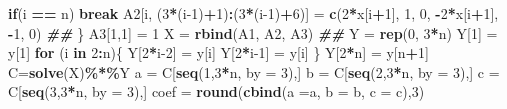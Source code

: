 \documentclass[
]{book}
\newenvironment{Shaded}{\begin{snugshade}}{\end{snugshade}}
\newcommand{\AttributeTok}[1]{\textcolor[rgb]{0.13,0.29,0.53}{#1}}
\newcommand{\ControlFlowTok}[1]{\textcolor[rgb]{0.13,0.29,0.53}{\textbf{#1}}}
\newcommand{\DecValTok}[1]{\textcolor[rgb]{0.00,0.00,0.81}{#1}}
\newcommand{\DocumentationTok}[1]{\textcolor[rgb]{0.56,0.35,0.01}{\textbf{\textit{#1}}}}
\newcommand{\FunctionTok}[1]{\textcolor[rgb]{0.13,0.29,0.53}{\textbf{#1}}}
\newcommand{\NormalTok}[1]{#1}
\newcommand{\OtherTok}[1]{\textcolor[rgb]{0.56,0.35,0.01}{#1}}
\newcommand{\SpecialCharTok}[1]{\textcolor[rgb]{0.81,0.36,0.00}{\textbf{#1}}}
\begin{document}
\begin{Shaded}
\begin{Highlighting}[]
       \ControlFlowTok{if}\NormalTok{(i }\SpecialCharTok{==}\NormalTok{ n) }\ControlFlowTok{break}
\NormalTok{       A2[i, (}\DecValTok{3}\SpecialCharTok{*}\NormalTok{(i}\DecValTok{{-}1}\NormalTok{)}\SpecialCharTok{+}\DecValTok{1}\NormalTok{)}\SpecialCharTok{:}\NormalTok{(}\DecValTok{3}\SpecialCharTok{*}\NormalTok{(i}\DecValTok{{-}1}\NormalTok{)}\SpecialCharTok{+}\DecValTok{6}\NormalTok{)] }\OtherTok{=} \FunctionTok{c}\NormalTok{(}\DecValTok{2}\SpecialCharTok{*}\NormalTok{x[i}\SpecialCharTok{+}\DecValTok{1}\NormalTok{], }\DecValTok{1}\NormalTok{, }\DecValTok{0}\NormalTok{, }\SpecialCharTok{{-}}\DecValTok{2}\SpecialCharTok{*}\NormalTok{x[i}\SpecialCharTok{+}\DecValTok{1}\NormalTok{], }\SpecialCharTok{{-}}\DecValTok{1}\NormalTok{, }\DecValTok{0}\NormalTok{)}
       \DocumentationTok{\#\#}
\NormalTok{      \}}
\NormalTok{     A3[}\DecValTok{1}\NormalTok{,}\DecValTok{1}\NormalTok{] }\OtherTok{=} \DecValTok{1}
\NormalTok{     X }\OtherTok{=} \FunctionTok{rbind}\NormalTok{(A1, A2, A3)}
     \DocumentationTok{\#\#}
\NormalTok{     Y }\OtherTok{=} \FunctionTok{rep}\NormalTok{(}\DecValTok{0}\NormalTok{, }\DecValTok{3}\SpecialCharTok{*}\NormalTok{n)}
\NormalTok{     Y[}\DecValTok{1}\NormalTok{] }\OtherTok{=}\NormalTok{ y[}\DecValTok{1}\NormalTok{]}
     \ControlFlowTok{for}\NormalTok{ (i }\ControlFlowTok{in} \DecValTok{2}\SpecialCharTok{:}\NormalTok{n)\{}
\NormalTok{         Y[}\DecValTok{2}\SpecialCharTok{*}\NormalTok{i}\DecValTok{{-}2}\NormalTok{] }\OtherTok{=}\NormalTok{ y[i]}
\NormalTok{         Y[}\DecValTok{2}\SpecialCharTok{*}\NormalTok{i}\DecValTok{{-}1}\NormalTok{] }\OtherTok{=}\NormalTok{ y[i]}
\NormalTok{        \}}
\NormalTok{     Y[}\DecValTok{2}\SpecialCharTok{*}\NormalTok{n] }\OtherTok{=}\NormalTok{ y[n}\SpecialCharTok{+}\DecValTok{1}\NormalTok{]}
\NormalTok{     C}\OtherTok{=}\FunctionTok{solve}\NormalTok{(X)}\SpecialCharTok{\%*\%}\NormalTok{Y}
\NormalTok{     a }\OtherTok{=}\NormalTok{ C[}\FunctionTok{seq}\NormalTok{(}\DecValTok{1}\NormalTok{,}\DecValTok{3}\SpecialCharTok{*}\NormalTok{n, }\AttributeTok{by =} \DecValTok{3}\NormalTok{),]}
\NormalTok{     b }\OtherTok{=}\NormalTok{ C[}\FunctionTok{seq}\NormalTok{(}\DecValTok{2}\NormalTok{,}\DecValTok{3}\SpecialCharTok{*}\NormalTok{n, }\AttributeTok{by =} \DecValTok{3}\NormalTok{),]}
\NormalTok{     c }\OtherTok{=}\NormalTok{ C[}\FunctionTok{seq}\NormalTok{(}\DecValTok{3}\NormalTok{,}\DecValTok{3}\SpecialCharTok{*}\NormalTok{n, }\AttributeTok{by =} \DecValTok{3}\NormalTok{),]}
\NormalTok{     coef }\OtherTok{=} \FunctionTok{round}\NormalTok{(}\FunctionTok{cbind}\NormalTok{(}\AttributeTok{a =}\NormalTok{a, }\AttributeTok{b =}\NormalTok{ b, }\AttributeTok{c =}\NormalTok{ c),}\DecValTok{3}\NormalTok{)}

\end{Highlighting}
\end{Shaded}
\end{document}
